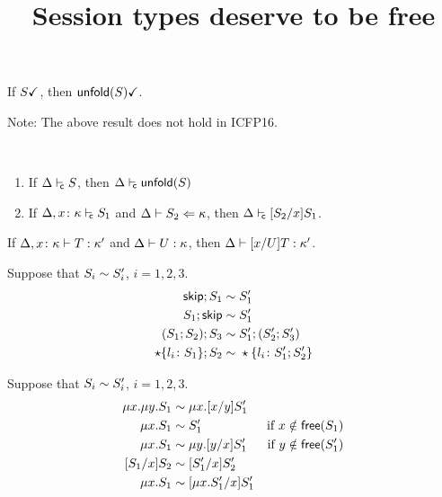 \documentclass{article}
\title{Session types deserve to be free}
\begin{document}



\begin{lemma}
  If $\done S$, then $\done{\unfoldk(S)}$.  
\end{lemma}

Note: The above result does not hold in ICFP16.

\begin{lemma}\
  \begin{enumerate}
  \item If $\isContr S$, then $\isContr{\unfoldk(S)}$
  \item If $\isContr[\Delta,x\colon\kind]{S_1}$ and $\algkindin {S_2} \kind$,
    then $\isContr{\subs{S_2}{x}{S_1}}$.
  \end{enumerate}
\end{lemma}




\begin{lemma}
  If $\isType[\Delta,x\colon\kind] T\kind'$ and $\isType U\kind$, then
  $\isType{\subs xUT}{\kind'}$.
\end{lemma}


\begin{lemma}
  \label{lemma:seq-laws}
  Suppose that $S_i \TypeEquiv S'_i$, $i=1,2,3$.
  \begin{align*}
    \skipk;S_1 \TypeEquiv&\; S'_1
    \\
    S_1;\skipk \TypeEquiv&\; S_1'
    \\
    (S_1;S_2);S_3 \TypeEquiv&\; S'_1;(S'_2;S'_3)
    \\
    \star\{l_i\colon S_1\};S_2 \TypeEquiv&\; \star\{l_i\colon S'_1;S'_2\}
  \end{align*}
\end{lemma}

\begin{lemma}
\label{lemma:mu-laws}
  Suppose that $S_i \TypeEquiv S'_i$, $i=1,2,3$.
  \begin{align*}
    \mu x. \mu y. S_1 \TypeEquiv&\; \mu x. \subs xy{S_1'}
    \\
    \mu x.S_1 \TypeEquiv&\; S'_1 &\text{if } x \notin \free (S_1)
    \\
    \mu x.S_1 \TypeEquiv&\; \mu y.\subs yx{S_1'} &\text{if } y \notin \free (S'_1)
    \\
    \subs{S_1}{x}{S_2} \TypeEquiv&\; \subs{S_1'}{x}{S_2'}
    \\
    \mu x.S_1 \TypeEquiv&\; \subs{\mu x.S_1'}{x}{S_1'}
  \end{align*}
\end{lemma}

% 
% 
\end{document}
